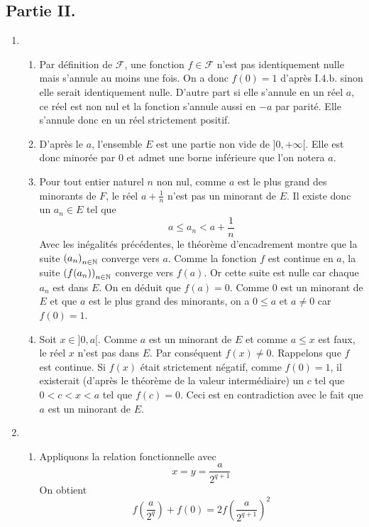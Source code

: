 \subsection*{Partie II.}
\begin{enumerate}
 \item 
\begin{enumerate}
 \item Par définition de $\mathcal F$, une fonction $f\in \mathcal F$ n'est pas identiquement nulle mais s'annule au moins une fois. On a donc $f(0)=1$ d'après I.4.b. sinon elle serait identiquement nulle. D'autre part si elle s'annule en un réel $a$, ce réel est non nul et la fonction s'annule aussi en $-a$ par parité. Elle s'annule donc en un réel strictement positif.
 \item D'après le $a$, l'ensemble $E$ est une partie non vide de $]0,+\infty[$. Elle est donc minorée par $0$ et admet une borne inférieure que l'on notera $a$.
 \item Pour tout entier naturel $n$ non nul, comme $a$ est le plus grand des minorants de $F$, le réel $a+\frac{1}{n}$ n'est pas un minorant de $E$. Il existe donc un $a_n\in E$ tel que 
\begin{displaymath}
a\leq a_n < a+\frac{1}{n} 
\end{displaymath}
Avec les inégalités précédentes, le théorème d'encadrement montre que la suite $\left( a_n\right) _{n\in \mathbb{N}}$ converge vers $a$. Comme la fonction $f$ est continue en $a$, la suite $\left( f(a_n)\right) _{n\in \mathbb{N}}$ converge vers $f(a)$. Or cette suite est nulle car chaque $a_n$ est dans $E$. On en déduit que $f(a)=0$.\newline
Comme $0$ est un minorant de $E$ et que $a$ est le plus grand des minorants, on a $0\leq a$ et $a\neq 0$ car $f(0)=1$. 
 \item  Soit $x\in ]0,a[$. Comme $a$ est un minorant de $E$ et comme $a\leq x$ est faux, le réel $x$ n'est pas dans $E$. Par conséquent $f(x)\neq0$.\newline
Rappelons que $f$ est continue. Si $f(x)$ était strictement négatif, comme $f(0)=1$, il existerait (d'après le théorème de la valeur intermédiaire) un $c$ tel que $0<c<x<a$ tel que $f(c)=0$. Ceci est en contradiction avec le fait que $a$ est un minorant de $E$.
\end{enumerate}

 \item 
\begin{enumerate}
 \item Appliquons la relation fonctionnelle avec
\begin{displaymath}
 x=y=\frac{a}{2^{q+1}}
\end{displaymath}
On obtient
\begin{displaymath}
 f(\frac{a}{2^{q}})+f(0)= 2f(\frac{a}{2^{q+1}})^2
\end{displaymath}


\end{enumerate}
\end{enumerate}
